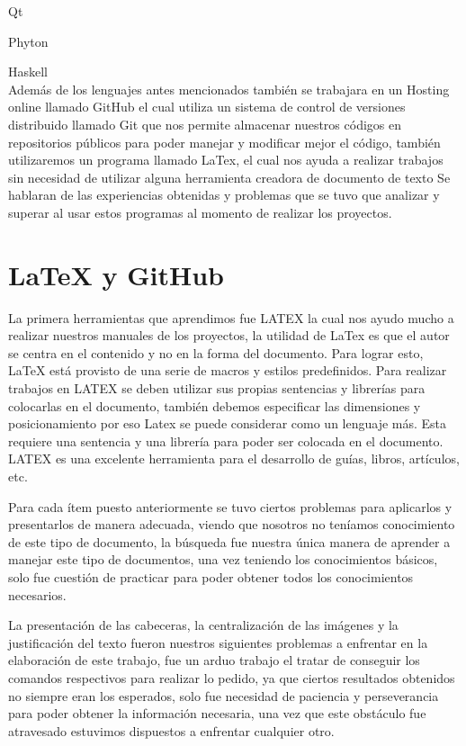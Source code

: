 \documentclass[12pt]{extbook}
\begin{document}
\textbullet{} Qt

\textbullet{} Phyton 

\textbullet{} Haskell\\
Además de los lenguajes antes mencionados también se trabajara en un Hosting online llamado GitHub el cual utiliza  un sistema de control de versiones distribuido llamado Git que nos permite almacenar nuestros códigos en repositorios públicos para poder manejar y modificar mejor el código, también utilizaremos un programa llamado LaTex, el cual nos ayuda a realizar trabajos sin necesidad de utilizar alguna herramienta creadora de documento de texto
 Se hablaran de las experiencias obtenidas y problemas que se tuvo que analizar y superar al  usar estos programas al momento de realizar los proyectos.

\chapter{\LaTeX{} y GitHub}
La primera herramientas que aprendimos fue LATEX la cual nos ayudo mucho a realizar nuestros manuales de los proyectos, la utilidad de LaTex es que el autor se centra en el contenido y no en la forma del documento. Para lograr esto, LaTeX está provisto de una serie de macros y estilos predefinidos.  Para realizar trabajos en LATEX se deben utilizar sus propias sentencias y librerías para colocarlas en el documento, también debemos especificar las dimensiones y posicionamiento por eso Latex se puede considerar como un lenguaje más. Esta requiere una sentencia y una librería para poder ser colocada en el documento.
 LATEX es una excelente herramienta para el  desarrollo de guías, libros, artículos, etc.


Para cada ítem puesto anteriormente se tuvo ciertos problemas para aplicarlos y presentarlos de manera adecuada, viendo que nosotros no teníamos conocimiento de este tipo de documento, la búsqueda fue nuestra única manera de aprender a manejar este tipo de documentos, una vez teniendo los conocimientos básicos, solo fue cuestión de practicar para poder obtener todos los conocimientos necesarios.


La presentación de las cabeceras, la centralización de las imágenes y la justificación del texto fueron nuestros siguientes problemas a enfrentar en la elaboración de este trabajo, fue un arduo trabajo el tratar de conseguir los comandos respectivos para realizar lo pedido, ya que ciertos resultados obtenidos no siempre eran los esperados, solo fue necesidad de paciencia y perseverancia para poder obtener la información necesaria, una vez que este obstáculo fue atravesado estuvimos dispuestos a enfrentar cualquier otro.
\end{document}
